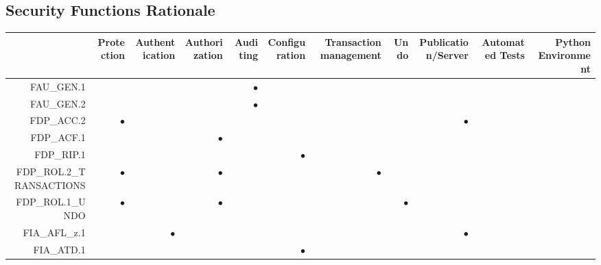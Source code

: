\documentclass[12pt,english]{scrbook}
\newcommand{\oh}{$\bullet$}
\begin{document}
\subsection{Security Functions Rationale}

\begin{table}
    \scriptsize
    \begin{tabular}{rRRRRRRRRRR}
        \toprule
                    & Protection & Authentication & Authorization & Auditing & Configuration & Transaction management & Undo & Publication/Server & Automated Tests & Python Environment \\
        \midrule
FAU\_GEN.1          &            &                &               & \oh      &               &                        &      &                    &                 &                    \\   
FAU\_GEN.2          &            &                &               & \oh      &               &                        &      &                    &                 &                    \\   
FDP\_ACC.2          & \oh        &                &               &          &               &                        &      & \oh                &                 &                    \\   
FDP\_ACF.1          &            &                &  \oh          &          &               &                        &      &                    &                 &                    \\   
FDP\_RIP.1          &            &                &               &          & \oh           &                        &      &                    &                 &                    \\   
FDP\_ROL.2\_TRANSACTIONS
                    & \oh        &                &  \oh          &          &               & \oh                    &      &                    &                 &                    \\   
FDP\_ROL.1\_UNDO    & \oh        &                &  \oh          &          &               &                        & \oh  &                    &                 &                    \\   
FIA\_AFL\_z.1       &            &  \oh           &               &          &               &                        &      & \oh                &                 &                    \\   
FIA\_ATD.1          &            &                &               &          & \oh           &                        &      &                    &                 &                    \\   

\end{tabular}
\end{table}
\end{document}

